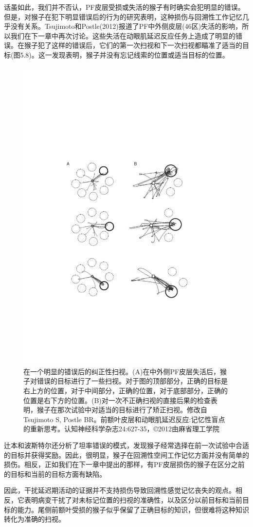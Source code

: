 话虽如此，我们并不否认，PF皮层受损或失活的猴子有时确实会犯明显的错误。但是，对猴子在犯下明显错误后的行为的研究表明，这种损伤与回溯性工作记忆几乎没有关系。Tsujimoto和Postle(2012)报道了PF中外侧皮层(46区)失活的影响，所以我们在下一章中再次讨论。这些失活在动眼肌延迟反应任务上造成了明显的错误。在猴子犯了这样的错误后，它们的第一次扫视和下一次扫视都瞄准了适当的目标(图5.8)。这一发现表明，猴子并没有忘记线索的位置或适当目标的位置。
\begin{figure}
	\centering
	\includegraphics[width=0.7\linewidth]{image_pfc/Fig_5_8}
	\caption{在一个明显的错误后的纠正性扫视。(A)在中外侧PF皮层失活后，猴子对错误的目标进行了一些扫视。对于图的顶部部分，正确的目标是右上方的位置，对于中间部分，正确的位置，对于底部部分，正确的位置是右下方的位置。(B)对一次不正确扫视的直接后果的检查表明，猴子在那次试验中对适当的目标进行了矫正扫视。修改自Tsujimoto S, Postle BR。前额叶皮层和动眼肌延迟反应:记忆性盲点的重新思考。认知神经科学杂志24:627-35，©2012由麻省理工学院}
	\label{fig:fig}
\end{figure}
辻本和波斯特尔还分析了坦率错误的模式，发现猴子经常选择在前一次试验中合适的目标并获得奖励。因此，很明显，猴子在回溯性空间工作记忆方面并没有简单的损伤。相反，正如我们在下一章中提出的那样，有PF皮层损伤的猴子在区分之前的目标和当前的目标方面有缺陷。

因此，干扰延迟期活动的证据并不支持损伤导致回溯性感觉记忆丧失的观点。相反，它表明病变干扰了对未标记位置的扫视的准确性，以及区分以前目标和当前目标的能力。尾侧前额叶受损的猴子似乎保留了正确目标的知识，但很难将这种知识转化为准确的扫视。
